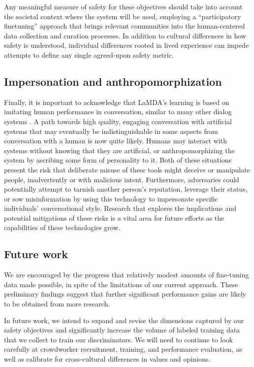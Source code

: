 \documentclass{article}
\begin{document}
Any meaningful measure of safety for these objectives should take into account the societal context where the system will be used, employing a “participatory finetuning” approach that brings relevant communities into the human-centered data collection and curation processes. In addition to cultural differences in how safety is understood, individual differences rooted in lived experience can impede attempts to define any single agreed-upon safety metric.

\subsection{Impersonation and anthropomorphization}
Finally, it is important to acknowledge that LaMDA’s learning is based on imitating human performance in conversation, similar to many other dialog systems \cite{adiwardana2020humanlike,blenderbot}. A path towards high quality, engaging conversation with artificial systems that may eventually be indistinguishable in some aspects from conversation with a human is now quite likely. Humans may interact with systems without knowing that they are artificial, or anthropomorphizing the system by ascribing some form of personality to it. Both of these situations present the risk that deliberate misuse of these tools might deceive or manipulate people, inadvertently or with malicious intent. Furthermore, adversaries could potentially attempt to tarnish another person’s reputation, leverage their status, or sow misinformation by using this technology to impersonate specific individuals' conversational style. Research that explores the implications and potential mitigations of these risks is a vital area for future efforts as the capabilities of these technologies grow.

\subsection{Future work}
We are encouraged by the progress that relatively modest amounts of fine-tuning data made possible, in spite of the limitations of our current approach. These preliminary findings suggest that further significant performance gains are likely to be obtained from more research.

In future work, we intend to expand and revise the dimensions captured by our safety objectives and significantly increase the volume of labeled training data that we collect to train our discriminators. We will need to continue to look carefully at crowdworker recruitment, training, and performance evaluation, as well as calibrate for cross-cultural differences in values and opinions.
\end{document}
